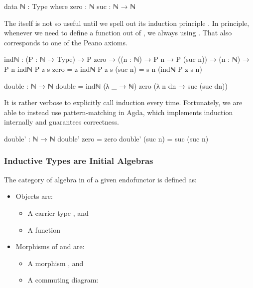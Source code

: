 \begin{code}
data ℕ : Type where
  zero : ℕ
  suc : ℕ → ℕ
\end{code}

 The  itself is not so useful until we spell out its induction principle . In principle, whenever we need to define a function out of , we always using . That also corresponds to one of the Peano axioms.

\begin{code}
indℕ : (P : ℕ → Type)
  → P zero
  → ((n : ℕ) → P n → P (suc n))
  → (n : ℕ) → P n
indℕ P z s zero = z
indℕ P z s (suc n) = s n (indℕ P z s n)

double : ℕ → ℕ
double = indℕ (λ _ → ℕ) zero (λ n dn → suc (suc dn))
\end{code}

It is rather verbose to explicitly call induction every time. Fortunately, we are able to instead use pattern-matching in Agda, which implements induction internally and guarantees correctness.

\begin{code}
double' : ℕ → ℕ
double' zero = zero
double' (suc n) = suc (suc n)
\end{code}

\subsubsection*{Inductive Types are Initial Algebras}

The category of algebra in  of a given endofunctor  \AgdaSymbol{:}    is defined as:
\begin{itemize}
  \item{Objects are:}
  \begin{itemize}
    \item{A carrier type  \AgdaSymbol{:} }, and
    \item{A function  \AgdaSymbol{:}    }
  \end{itemize}
  \item{Morphisms of \AgdaSymbol{(} \AgdaInductiveConstructor{,} \AgdaSymbol{)} and \AgdaSymbol{(} \AgdaInductiveConstructor{,} \AgdaSymbol{)} are:}
  \begin{itemize}
    \item{A morphism  \AgdaSymbol{:}   }, and
    \item{A commuting diagram:}
  \end{itemize}
\end{itemize}


